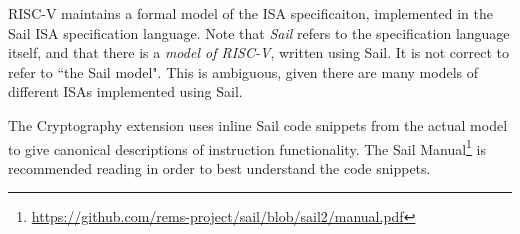 
RISC-V maintains a formal model of the ISA specificaiton, implemented
in the Sail ISA specification language\cite{sail}.
Note that {\em Sail} refers to the specification language itself,
and that there is a {\em model of RISC-V}, written using Sail.
It is not correct to refer to ``the Sail model".
This is ambiguous, given there are many models of different ISAs implemented
using Sail.

The Cryptography extension uses inline Sail code snippets from the
actual model to give canonical descriptions of instruction
functionality.
The Sail Manual\footnote{\url{https://github.com/rems-project/sail/blob/sail2/manual.pdf}} is recommended reading in order to
best understand the code snippets.
